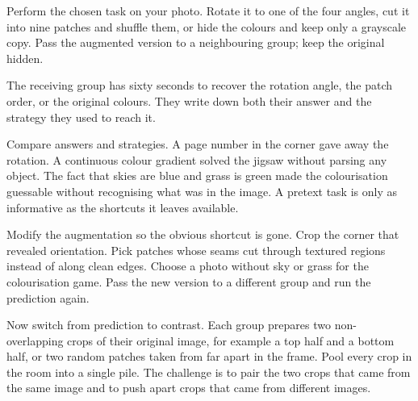 
Perform the chosen task on your photo. Rotate it to one of the four angles, cut it into nine patches and shuffle them, or hide the colours and keep only a grayscale copy. Pass the augmented version to a neighbouring group; keep the original hidden.

The receiving group has sixty seconds to recover the rotation angle, the patch order, or the original colours. They write down both their answer and the strategy they used to reach it.

Compare answers and strategies. A page number in the corner gave away the rotation. A continuous colour gradient solved the jigsaw without parsing any object. The fact that skies are blue and grass is green made the colourisation guessable without recognising what was in the image. A pretext task is only as informative as the shortcuts it leaves available.


Modify the augmentation so the obvious shortcut is gone. Crop the corner that revealed orientation. Pick patches whose seams cut through textured regions instead of along clean edges. Choose a photo without sky or grass for the colourisation game. Pass the new version to a different group and run the prediction again.

Now switch from prediction to contrast. Each group prepares two non-overlapping crops of their original image, for example a top half and a bottom half, or two random patches taken from far apart in the frame. Pool every crop in the room into a single pile. The challenge is to pair the two crops that came from the same image and to push apart crops that came from different images.

